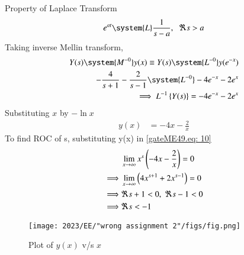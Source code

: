 \documentclass[journal,12pt,twocolumn]{IEEEtran}
\theoremstyle{remark}
\begin{document}
Property of Laplace Transform 
\begin{align}
     e^{at} \system{L} \frac{1}{s-a},\;\; \Re s>a 
\end{align}
Taking inverse Mellin transform,
 \begin{align}
    Y(s) \system{M^{-0}} y(x) \equiv Y(s) \system{L^{-0}} y(e^{-x})\\
    -\frac{4}{s+1}-\frac{2}{s-1}\system{L^{-0}} -4e^{-x}-2e^{x}\\
    \implies L^{-1} \cbrak{Y(s)} = -4e^{-x}-2e^{x}
\end{align}
Substituting $x$ by $-\ln x$
\begin{align}
    y(x)&=-4x-\frac{2}{x}
\end{align}
To find ROC of s, substituting y(x) in \eqref{gateME49.eq: 10}
\begin{align} 
    &\lim_{x\rightarrow \infty} x^s \left(-4x-\frac{2}{x}\right)=0\\ \label{gateME49.eq:24}
    \implies& \lim_{x\rightarrow \infty} \left(4x^{s+1}+2x^{s-1}\right)=0\\
    \implies& \Re s+1<0,\;\Re s-1<0\\
    \implies& \Re s<-1\label{gateME49.eq:27}
\end{align}

\begin{figure}[h]
    \centering
    \texttt{[image: 2023/EE/"wrong assignment 2"/figs/fig.png]}
    \caption{Plot of $y(x)$ v/s $x$}
\end{figure}
\end{document}
